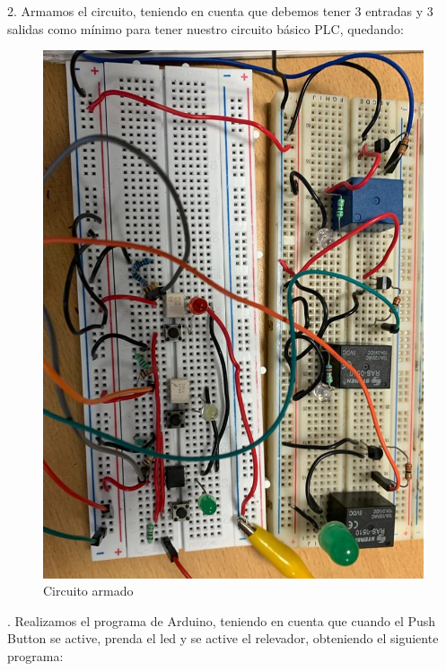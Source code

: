 \documentclass[12pt,a4paper]{article}
\begin{document}
2. Armamos el circuito, teniendo en cuenta que debemos tener 3 entradas y 3 salidas como mínimo para tener nuestro circuito básico PLC, quedando: 
\begin{figure}[hbtp]
\centering
\includegraphics[scale=0.4]{Circuito/Circuito3.jpg}
\caption{Circuito armado}
\end{figure}

. Realizamos el programa de Arduino, teniendo en cuenta que cuando el Push Button se active, prenda el led y se active el relevador, obteniendo el siguiente programa: 
\end{document}
